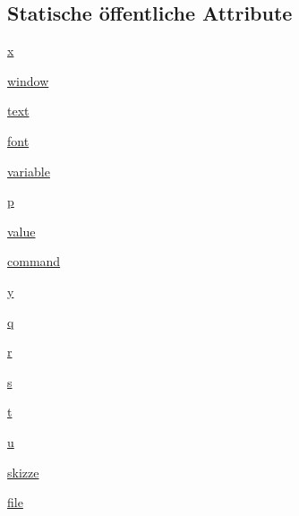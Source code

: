\subsection*{Statische öffentliche Attribute}
\begin{DoxyCompactItemize}
\item 
\hyperlink{class_f_i_n_a_l___g_u_i___w_l_a_n_1_1_w_l_a_n_a9336ebf25087d91c818ee6e9ec29f8c1}{x}
\item 
\hyperlink{class_f_i_n_a_l___g_u_i___w_l_a_n_1_1_w_l_a_n_a04a8a2bbfa9c15500892b8e5033d625b}{window}
\item 
\hyperlink{class_f_i_n_a_l___g_u_i___w_l_a_n_1_1_w_l_a_n_af575f17e6be3f269b86b041a60560dbf}{text}
\item 
\hyperlink{class_f_i_n_a_l___g_u_i___w_l_a_n_1_1_w_l_a_n_af18bb9025627467c42857f6b57902a47}{font}
\item 
\hyperlink{class_f_i_n_a_l___g_u_i___w_l_a_n_1_1_w_l_a_n_a9cd756653e5b34f63d5cf5c342143cb5}{variable}
\item 
\hyperlink{class_f_i_n_a_l___g_u_i___w_l_a_n_1_1_w_l_a_n_ac483f6ce851c9ecd9fb835ff7551737c}{p}
\item 
\hyperlink{class_f_i_n_a_l___g_u_i___w_l_a_n_1_1_w_l_a_n_afcc7a4b78ecd8fa7e713f8cfa0f51017}{value}
\item 
\hyperlink{class_f_i_n_a_l___g_u_i___w_l_a_n_1_1_w_l_a_n_a9e0992eae3950adccaf4847fbff4231d}{command}
\item 
\hyperlink{class_f_i_n_a_l___g_u_i___w_l_a_n_1_1_w_l_a_n_a2fb1c5cf58867b5bbc9a1b145a86f3a0}{y}
\item 
\hyperlink{class_f_i_n_a_l___g_u_i___w_l_a_n_1_1_w_l_a_n_a099b3b060154898840f0ebdfb46ec78f}{q}
\item 
\hyperlink{class_f_i_n_a_l___g_u_i___w_l_a_n_1_1_w_l_a_n_a514f1b439f404f86f77090fa9edc96ce}{r}
\item 
\hyperlink{class_f_i_n_a_l___g_u_i___w_l_a_n_1_1_w_l_a_n_a3691308f2a4c2f6983f2880d32e29c84}{s}
\item 
\hyperlink{class_f_i_n_a_l___g_u_i___w_l_a_n_1_1_w_l_a_n_aaccc9105df5383111407fd5b41255e23}{t}
\item 
\hyperlink{class_f_i_n_a_l___g_u_i___w_l_a_n_1_1_w_l_a_n_a6277e2a7446059985dc9bcf0a4ac1a8f}{u}
\item 
\hyperlink{class_f_i_n_a_l___g_u_i___w_l_a_n_1_1_w_l_a_n_a4cdc253e2c0afe1cf44b45dc9699433c}{skizze}
\item 
\hyperlink{class_f_i_n_a_l___g_u_i___w_l_a_n_1_1_w_l_a_n_a40a5d58ffa6e88aa578d6683ac413105}{file}
\item 

\end{DoxyCompactItemize}
